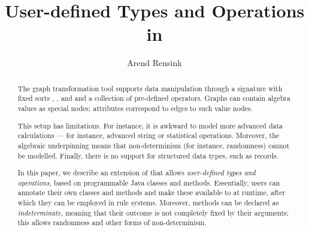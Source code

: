 \title{User-defined Types and Operations in \GROOVE}
\author{Arend Rensink}
\maketitle

\begin{abstract}
The graph transformation tool \GROOVE supports data manipulation through a signature with fixed sorts \intS, \realS, \boolS and \stringS and a collection of pre-defined operators. Graphs can contain algebra values as special nodes; attributes correspond to edges to such value nodes.

\smallskip
This setup has limitations. For instance, it is awkward to model more advanced data calculations --- for instance, advanced string or statistical operations. Moreover, the algebraic underpinning means that non-determinism (for instance, randomness) cannot be modelled. Finally, there is no support for structured data types, such as records.

\smallskip
In this paper, we describe an extension of \GROOVE that allows \emph{user-defined types and operations}, based on programmable Java classes and methods. Essentially, users can annotate their own classes and methods and make these available to \GROOVE at runtime, after which they can be employed in rule systems. Moreover, methods can be declared as \emph{indeterminate}, meaning that their outcome is not completely fixed by their arguments; this allows randomness and other forms of non-determinism.
\end{abstract}
